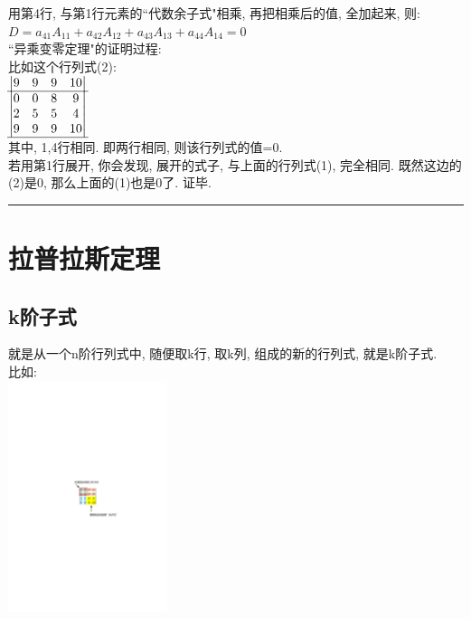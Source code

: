 \documentclass[UTF8]{ctexart}
\begin{document}
	用第4行, 与第1行元素的``代数余子式"相乘, 再把相乘后的值, 全加起来, 则:\\
	$ D= a_{41}A_{11} + a_{42}A_{12} + a_{43}A_{13} + a_{44}A_{14} = 0$ \\
	
	``异乘变零定理"的证明过程: \\	
	比如这个行列式(2): \\
	
	$
	\begin{matrix}
		\left| \begin{matrix}
			9&		9&		9&		10\\
			\hline
			0&		0&		8&		9\\
			2&		5&		5&		4\\
			9&		9&		9&		10\\
			\hline
		\end{matrix} \right|\\
	\end{matrix}
	$ \\
	
	其中, 1,4行相同. 即两行相同, 则该行列式的值=0. \\
	若用第1行展开, 你会发现, 展开的式子, 与上面的行列式(1), 完全相同. 既然这边的(2)是0, 那么上面的(1)也是0了. 证毕. \\
	
	
	
	
	
	
		\hrule
	
	\section{拉普拉斯定理}
	
	\subsection{k阶子式}
	
	就是从一个n阶行列式中, 随便取k行, 取k列, 组成的新的行列式, 就是k阶子式. \\
	比如:\\
\includegraphics[width=0.35\textwidth]{img/0014.pdf} \\
\end{document}
